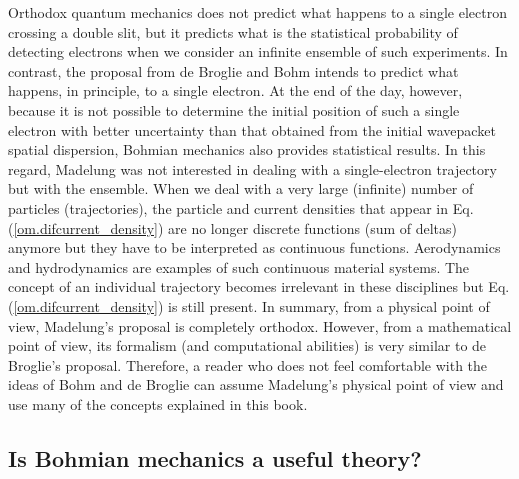 \documentclass[onecolumn,nofootinbib, secnumarabic, amsmath, nobibnotes,11pt,aps,pra]{revtex4-1}
\newcommand{\eref}[1]{Eq. (\ref{#1})}
\begin{document}
Orthodox quantum mechanics does not predict what happens to a single electron crossing a double slit, but it predicts what is the statistical probability of detecting electrons when we consider an infinite ensemble of such experiments. In contrast, the proposal from de Broglie and Bohm intends to predict what happens, in principle, to a single electron. At the end of the day, however, because it is not possible to determine the initial position of such a single electron with better uncertainty than that obtained from the initial wavepacket spatial dispersion, Bohmian mechanics also provides statistical results.
In this regard, Madelung was not interested in dealing with a single-electron trajectory but with the ensemble. When we deal with a very large (infinite) number of particles (trajectories), the particle and current densities that appear in \eref{om.difcurrent_density} are no longer discrete functions (sum of deltas) anymore but they have to be interpreted as continuous functions. Aerodynamics and hydrodynamics are examples of such continuous material systems. The concept of an individual trajectory becomes irrelevant in these disciplines but \eref{om.difcurrent_density} is still present. In summary, from a physical point of view, Madelung's proposal is completely orthodox. However, from a mathematical point of view, its formalism (and computational abilities) is very similar to de Broglie's proposal. Therefore, a reader who does not feel comfortable with the ideas of Bohm and de Broglie can assume Madelung's physical point of view and use many of the concepts explained in this book.

\vspace*{-6pt}
\subsection{Is Bohmian mechanics a useful theory?}\label{om.sec_intro.10}
\end{document}
